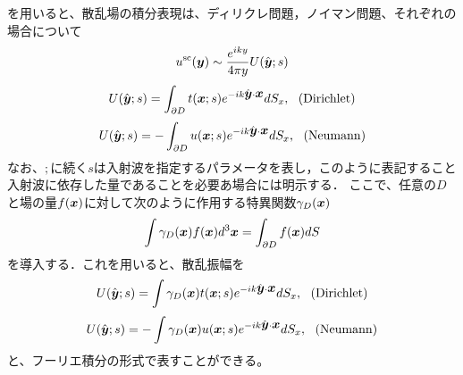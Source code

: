 \documentclass[10pt,a4j,dvipdfmx]{jarticle}
\begin{document}
を用いると、散乱場の積分表現は、ディリクレ問題，ノイマン問題、それぞれの場合について
\begin{equation}
	u^{\rm sc}(\mbox{\boldmath $y$}) \sim \frac{e^{iky}}{4\pi y} U(\hat{\mbox{\boldmath $y$}};s)  
	\label{eqn:}
\end{equation}
\begin{equation}
	U(\hat{\mbox{\boldmath $y$}};s)  = \int _{\partial D} t(\mbox{\boldmath $x$};s)e^{-ik\hat{\mbox{\boldmath $y$}}\cdot \mbox{\boldmath $x$}} dS_x
	, \ \ ( {\rm Dirichlet})
	\label{eqn:}
\end{equation}
\begin{equation}
	U(\hat{\mbox{\boldmath $y$}};s)  =-\int _{\partial D} u(\mbox{\boldmath $x$};s)e^{-ik\hat{\mbox{\boldmath $y$}}\cdot \mbox{\boldmath $x$}} dS_x
	, \ \ ({\rm Neumann})
	\label{eqn:}
\end{equation}
なお、$;$に続く$s$は入射波を指定するパラメータを表し，このように表記すること
入射波に依存した量であることを必要あ場合には明示する．
ここで、任意の$D$と場の量$f(\mbox{\boldmath $x$})$に対して次のように作用する特異関数$\gamma_D(\mbox{\boldmath $x$})$
\begin{equation}
	\int \gamma_D(\mbox{\boldmath $x$})f(\mbox{\boldmath $x$})d^3\mbox{\boldmath $x$} =\int _{\partial D} f(\mbox{\boldmath $x$}) dS
	\label{eqn:}
\end{equation}
を導入する．これを用いると、散乱振幅を
\begin{equation}
	U(\hat{\mbox{\boldmath $y$}};s)  = \int \gamma_D(\mbox{\boldmath $x$})t(\mbox{\boldmath $x$};s)e^{-ik\hat{\mbox{\boldmath $y$}}\cdot \mbox{\boldmath $x$}} dS_x
	, \ \ ( {\rm Dirichlet})
	\label{eqn:}
\end{equation}
\begin{equation}
	U(\hat{\mbox{\boldmath $y$}};s)  =-\int \gamma_D(\mbox{\boldmath $x$})u(\mbox{\boldmath $x$};s)e^{-ik\hat{\mbox{\boldmath $y$}}\cdot \mbox{\boldmath $x$}} dS_x
	, \ \ ({\rm Neumann})
	\label{eqn:}
\end{equation}
と、フーリエ積分の形式で表すことができる。
\end{document}
